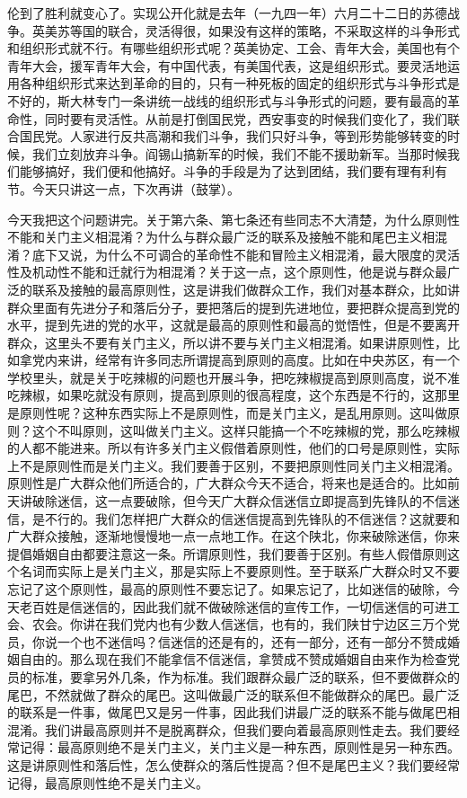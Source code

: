 伦到了胜利就变心了。实现公开化就是去年（一九四一年）六月二十二日的苏德战争。英美苏等国的联合，灵活得很，如果没有这样的策略，不采取这样的斗争形式和组织形式就不行。有哪些组织形式呢？英美协定、工会、青年大会，美国也有个青年大会，援军青年大会，有中国代表，有美国代表，这是组织形式。要灵活地运用各种组织形式来达到革命的目的，只有一种死板的固定的组织形式与斗争形式是不好的，斯大林专门一条讲统一战线的组织形式与斗争形式的问题，要有最高的革命性，同时要有灵活性。从前是打倒国民党，西安事变的时候我们变化了，我们联合国民党。人家进行反共高潮和我们斗争，我们只好斗争，等到形势能够转变的时候，我们立刻放弃斗争。阎锡山搞新军的时候，我们不能不援助新军。当那时候我们能够搞好，我们便和他搞好。斗争的手段是为了达到团结，我们要有理有利有节。今天只讲这一点，下次再讲（鼓掌）。

今天我把这个问题讲完。关于第六条、第七条还有些同志不大清楚，为什么原则性不能和关门主义相混淆？为什么与群众最广泛的联系及接触不能和尾巴主义相混淆？底下又说，为什么不可调合的革命性不能和冒险主义相混淆，最大限度的灵活性及机动性不能和迁就行为相混淆？关于这一点，这个原则性，他是说与群众最广泛的联系及接触的最高原则性，这是讲我们做群众工作，我们对基本群众，比如讲群众里面有先进分子和落后分子，要把落后的提到先进地位，要把群众提高到党的水平，提到先进的党的水平，这就是最高的原则性和最高的觉悟性，但是不要离开群众，这里头不要有关门主义，所以讲不要与关门主义相混淆。如果讲原则性，比如拿党内来讲，经常有许多同志所谓提高到原则的高度。比如在中央苏区，有一个学校里头，就是关于吃辣椒的问题也开展斗争，把吃辣椒提高到原则高度，说不准吃辣椒，如果吃就没有原则，提高到原则的很高程度，这个东西是不行的，这那里是原则性呢？这种东西实际上不是原则性，而是关门主义，是乱用原则。这叫做原则？这个不叫原则，这叫做关门主义。这样只能搞一个不吃辣椒的党，那么吃辣椒的人都不能进来。所以有许多关门主义假借着原则性，他们的口号是原则性，实际上不是原则性而是关门主义。我们要善于区别，不要把原则性同关门主义相混淆。原则性是广大群众他们所适合的，广大群众今天不适合，将来也是适合的。比如前天讲破除迷信，这一点要破除，但今天广大群众信迷信立即提高到先锋队的不信迷信，是不行的。我们怎样把广大群众的信迷信提高到先锋队的不信迷信？这就要和广大群众接触，逐渐地慢慢地一点一点地工作。在这个陕北，你来破除迷信，你来提倡婚姻自由都要注意这一条。所谓原则性，我们要善于区别。有些人假借原则这个名词而实际上是关门主义，那是实际上不要原则性。至于联系广大群众时又不要忘记了这个原则性，最高的原则性不要忘记了。如果忘记了，比如迷信的破除，今天老百姓是信迷信的，因此我们就不做破除迷信的宣传工作，一切信迷信的可进工会、农会。你讲在我们党内也有少数人信迷信，也有的，我们陕甘宁边区三万个党员，你说一个也不迷信吗？信迷信的还是有的，还有一部分，还有一部分不赞成婚姻自由的。那么现在我们不能拿信不信迷信，拿赞成不赞成婚姻自由来作为检查党员的标准，要拿另外几条，作为标准。我们跟群众最广泛的联系，但不要做群众的尾巴，不然就做了群众的尾巴。这叫做最广泛的联系但不能做群众的尾巴。最广泛的联系是一件事，做尾巴又是另一件事，因此我们讲最广泛的联系不能与做尾巴相混淆。我们讲最高原则并不是脱离群众，但我们要向着最高原则性走去。我们要经常记得：最高原则绝不是关门主义，关门主义是一种东西，原则性是另一种东西。这是讲原则性和落后性，怎么使群众的落后性提高？但不是尾巴主义？我们要经常记得，最高原则性绝不是关门主义。

